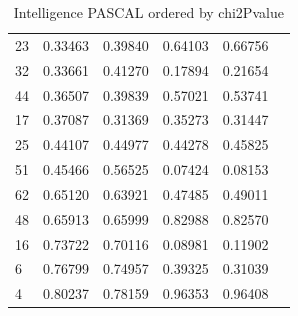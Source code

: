 \begin{table}[ht]
\begin{tabular}{llllll}
  23 & 0.33463 & 0.39840 & 0.64103 & 0.66756 \\ 
  32 & 0.33661 & 0.41270 & 0.17894 & 0.21654 \\ 
  44 & 0.36507 & 0.39839 & 0.57021 & 0.53741 \\ 
  17 & 0.37087 & 0.31369 & 0.35273 & 0.31447 \\ 
  25 & 0.44107 & 0.44977 & 0.44278 & 0.45825 \\ 
  51 & 0.45466 & 0.56525 & 0.07424 & 0.08153 \\ 
  62 & 0.65120 & 0.63921 & 0.47485 & 0.49011 \\ 
  48 & 0.65913 & 0.65999 & 0.82988 & 0.82570 \\ 
  16 & 0.73722 & 0.70116 & 0.08981 & 0.11902 \\ 
  6 & 0.76799 & 0.74957 & 0.39325 & 0.31039 \\ 
  4 & 0.80237 & 0.78159 & 0.96353 & 0.96408 \\ 
   \bottomrule
\end{tabular}
\caption{Intelligence PASCAL ordered by chi2Pvalue}
\label{tab:Intelligence PASCAL}
\end{table}


